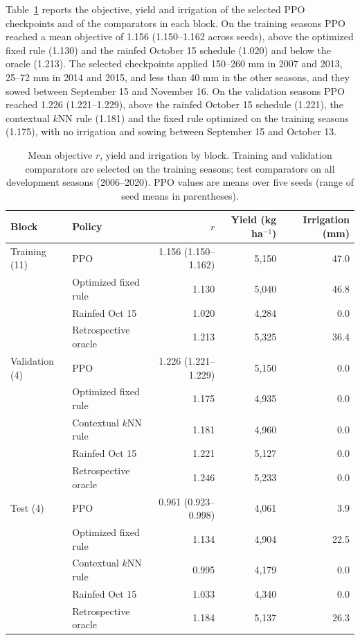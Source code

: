 \documentclass[times,final,authoryear]{elsarticle}
\begin{document}
Table~\ref{tab_by_split} reports the objective, yield and irrigation of the selected PPO checkpoints and of the comparators in each block. On the training seasons PPO reached a mean objective of 1.156 (1.150--1.162 across seeds), above the optimized fixed rule (1.130) and the rainfed October 15 schedule (1.020) and below the oracle (1.213). The selected checkpoints applied 150--260 mm in 2007 and 2013, 25--72 mm in 2014 and 2015, and less than 40 mm in the other seasons, and they sowed between September 15 and November 16. On the validation seasons PPO reached 1.226 (1.221--1.229), above the rainfed October 15 schedule (1.221), the contextual $k$NN rule (1.181) and the fixed rule optimized on the training seasons (1.175), with no irrigation and sowing between September 15 and October 13.

\begin{table}[!h]
\centering
\scriptsize
\caption{Mean objective $r$, yield and irrigation by block. Training and validation comparators are selected on the training seasons; test comparators on all development seasons (2006--2020). PPO values are means over five seeds (range of seed means in parentheses).}
\label{tab_by_split}
\begin{tabular}{llrrr}
\hline
Block & Policy & $r$ & Yield (kg ha$^{-1}$) & Irrigation (mm) \\
\hline
Training (11) & PPO & 1.156 (1.150--1.162) & 5,150 & 47.0 \\
              & Optimized fixed rule & 1.130 & 5,040 & 46.8 \\
              & Rainfed Oct 15 & 1.020 & 4,284 & 0.0 \\
              & Retrospective oracle & 1.213 & 5,325 & 36.4 \\
Validation (4) & PPO & 1.226 (1.221--1.229) & 5,150 & 0.0 \\
              & Optimized fixed rule & 1.175 & 4,935 & 0.0 \\
              & Contextual $k$NN rule & 1.181 & 4,960 & 0.0 \\
              & Rainfed Oct 15 & 1.221 & 5,127 & 0.0 \\
              & Retrospective oracle & 1.246 & 5,233 & 0.0 \\
Test (4)      & PPO & 0.961 (0.923--0.998) & 4,061 & 3.9 \\
              & Optimized fixed rule & 1.134 & 4,904 & 22.5 \\
              & Contextual $k$NN rule & 0.995 & 4,179 & 0.0 \\
              & Rainfed Oct 15 & 1.033 & 4,340 & 0.0 \\
              & Retrospective oracle & 1.184 & 5,137 & 26.3 \\
\hline
\end{tabular}
\end{table}
\end{document}
